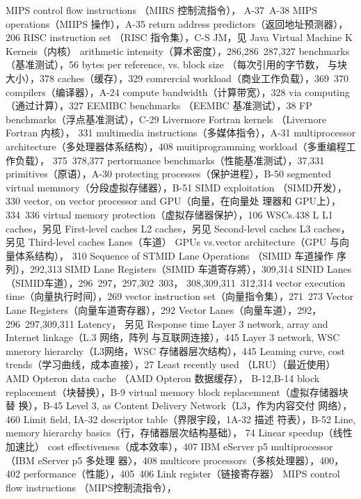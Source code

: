 MIPS control flow instructions （MIRS 控制流指令），
A-37~A-38
MIPS operations（MIIPS 操作），A-35
return address predictors（返回地址预测器），206
RISC instruction set （RISC 指令集），C-S
JM，见 Java Virtual Machine
K
Kerneis（内核）
arithmetic intensity（算术密度），286,286~287,327
benchmarks（基准测试），56
bytes per reference, vs. block size （每次引用的字节数，
与块大小），378
caches（缓存），329
comrercial workload（商业工作负载），369~370
compilers（编译器），A-24
compute bandwidth（计算带宽），328
via computing（通过计算），327
EEMIBC benchmarks （EEMBC 基准测试），38
FP benchmarks（浮点基准测试），C-29
Livermore Fortran kernels （Livernore Fortran 内核），
331
multimedia instructions（多媒体指令），A-31
multiprocessor architecture（多处理器体系结构），408
muitiprogramming workload（多重编程工作负载），
375~378,377
pertormance benchmarks（性能基准测试），37,331
primitives（原语），A-30
protecting processes（保护进程），B-50
segmented virtual memmory（分段虚拟存储器），B-51
SIMD exploitation （SIMD开发），330
vector, on vector processor and GPU（向量，在向量处
理器和 GPU上），334~336
virtual memory protection（虚拟存储器保护），106
WSCs.438
L
L1 caches，另见 First-level caches
L2 caches，另见 Second-level caches
L3 caches，另见 Third-level caches
Lanes（车道）
GPUs vs.vector architecture（GPU 与向量体系结构），
310
Sequence of STMID Lane Operations （SIMID 车道操作
序列），292,313
SIMD Lane Registers（SIMID 车道寄存將），309,314
SINID Lanes（SIMID车道），296~297，297,302~303，
308,309,311~312,314
vector execution time（向量执行时间），269
vector instruction set（向量指令集），271~273
Vector Lane Registers（向量车道寄存器），292
Vector Lanes（向量车道），292，296~297,309,311
Latency， 另见 Response time
Layer 3 network, array and Internet linkage（L.3 网络，阵列
与互联网连接），445
Layer 3 network, WSC mnerory hierarchy（L3网络，WSC
存储器层次结构），445
Leaming curve, cost trends（学习曲线，成本直接），27
Least recently used （LRU）（最近使用）
AMD Opteron data cache （AMD Opteron 数据缓存），
B-12,B-14
block replacement（块替换），B-9
virtual memory block replacemnent（虚拟存储器块替
换），B-45
Level 3, as Content Delivery Network（L3，作为内容交付
网络），460
Limit field, IA-32 descriptor table（界限宇段，1A-32 描述
符表），B-52
Line, memory hierarchy basics（行，存储器层次结构基础），
74
Linear speedup（线性加速比）
cost effectiveness（成本效率），407
IBM eServer p5 multiprocessor （IBM eServer p5 多处理
器〉，408
multicore processors（多核处理器），400，402
performance（性能），405~406
Link register（链接寄存器）
MIPS control flow instructions （MIPS控制流指令），
